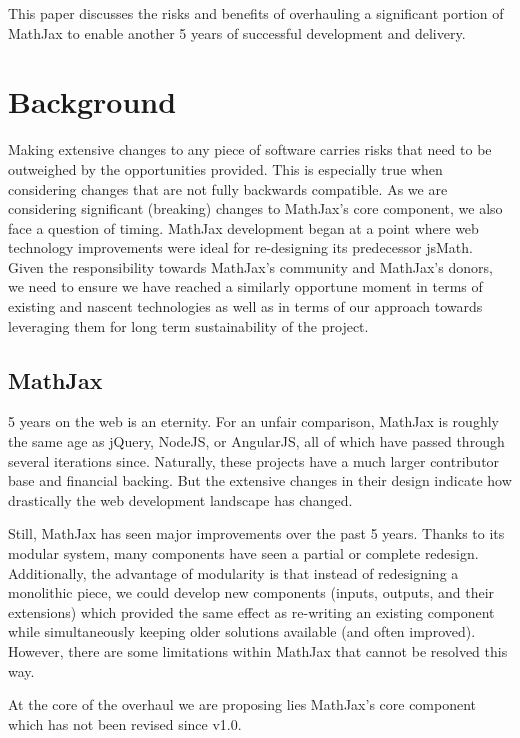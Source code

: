 \documentclass[]{amsart}
\begin{document}
This paper discusses the risks and benefits of overhauling a significant
portion of MathJax to enable another 5 years of successful development
and delivery.

\section{Background}\label{background}

Making extensive changes to any piece of software carries risks that
need to be outweighed by the opportunities provided. This is especially
true when considering changes that are not fully backwards compatible.
As we are considering significant (breaking) changes to MathJax's core
component, we also face a question of timing. MathJax development began
at a point where web technology improvements were ideal for re-designing
its predecessor jsMath. Given the responsibility towards MathJax's
community and MathJax's donors, we need to ensure we have reached a
similarly opportune moment in terms of existing and nascent technologies
as well as in terms of our approach towards leveraging them for long
term sustainability of the project.

\subsection{MathJax}\label{mathjax}

5 years on the web is an eternity. For an unfair comparison, MathJax is
roughly the same age as jQuery, NodeJS, or AngularJS, all of which have
passed through several iterations since. Naturally, these projects have
a much larger contributor base and financial backing. But the extensive
changes in their design indicate how drastically the web development
landscape has changed.

Still, MathJax has seen major improvements over the past 5 years. Thanks
to its modular system, many components have seen a partial or complete
redesign. Additionally, the advantage of modularity is that instead of
redesigning a monolithic piece, we could develop new components (inputs,
outputs, and their extensions) which provided the same effect as
re-writing an existing component while simultaneously keeping older
solutions available (and often improved). However, there are some
limitations within MathJax that cannot be resolved this way.

At the core of the overhaul we are proposing lies MathJax's core
component which has not been revised since v1.0.
\end{document}
